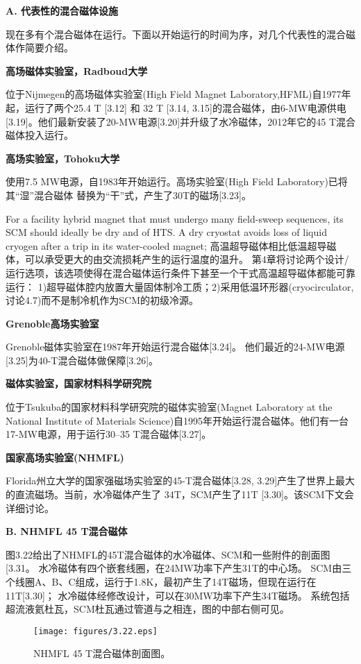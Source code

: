 \textbf{A. 代表性的混合磁体设施}

现在多有个混合磁体在运行。下面以开始运行的时间为序，对几个代表性的混合磁体作简要介绍。

\textbf{\kaishu 高场磁体实验室，Radboud大学}

位于Nijmegen的高场磁体实验室(High Field Magnet Laboratory,HFML)自1977年起，运行了两个25.4 T [3.12] 和 32 T [3.14, 3.15]的混合磁体，由6-MW电源供电[3.19]。他们最新安装了20-MW电源[3.20]并升级了水冷磁体，2012年它的45 T混合磁体投入运行。

\textbf{\kaishu 高场实验室，Tohoku大学}

使用7.5 MW电源，自1983年开始运行。高场实验室(High Field Laboratory)已将其“湿”混合磁体
替换为“干”式，产生了30T的磁场[3.23]。

For a facility hybrid magnet that must undergo many field-sweep sequences, its
SCM should ideally be dry and of HTS. A dry cryostat avoids loss of liquid cryogen
after a trip in its water-cooled magnet;
高温超导磁体相比低温超导磁体，可以承受更大的由交流损耗产生的运行温度的温升。
第4章将讨论两个设计/运行选项，该选项使得在混合磁体运行条件下甚至一个干式高温超导磁体都能可靠运行：
1)超导磁体腔内放置大量固体制冷工质；2)采用低温环形器(cryocirculator,讨论4.7)而不是制冷机作为SCM的初级冷源。

\textbf{\kaishu Grenoble高场实验室}

Grenoble磁体实验室在1987年开始运行混合磁体[3.24]。
他们最近的24-MW电源[3.25]为40-T混合磁体做保障[3.26]。

\textbf{\kaishu 磁体实验室，国家材料科学研究院}

位于Tsukuba的国家材料科学研究院的磁体实验室(Magnet Laboratory at the National Institute of Materials Science)自1995年开始运行混合磁体。他们有一台17-MW电源，用于运行30–35 T混合磁体[3.27]。

\textbf{\kaishu 国家高场实验室(NHMFL)}

Florida州立大学的国家强磁场实验室的45-T混合磁体[3.28, 3.29]产生了世界上最大的直流磁场。当前，水冷磁体产生了
34T，SCM产生了11T [3.30]。该SCM下文会详细讨论。

\textbf{B. NHMFL 45 T混合磁体}

图3.22给出了NHMFL的45T混合磁体的水冷磁体、SCM和一些附件的剖面图[3.31。
水冷磁体有四个嵌套线圈，在24MW功率下产生31T的中心场。
SCM由三个线圈A、B、C组成，运行于1.8K，最初产生了14T磁场，但现在运行在11T[3.30]；
水冷磁体经修改设计，可以在30MW功率下产生34T磁场。
系统包括超流液氦杜瓦，SCM杜瓦通过管道与之相连，图的中部右侧可见。
\begin{figure}[htbp]
	\centering
	\texttt{[image: figures/3.22.eps]}
	\caption{NHMFL 45 T混合磁体剖面图。}
\end{figure}

